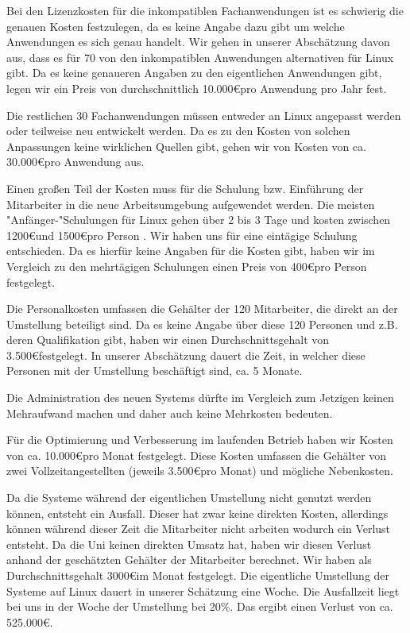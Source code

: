 \documentclass[12pt,utf8]{scrartcl}
\begin{document}
Bei den Lizenzkosten für die inkompatiblen Fachanwendungen ist es schwierig die genauen Kosten festzulegen, da es keine Angabe dazu gibt um welche Anwendungen es sich genau handelt. Wir gehen in unserer Abschätzung davon aus, dass es für 70 von den inkompatiblen Anwendungen alternativen für Linux gibt. Da es keine genaueren Angaben zu den eigentlichen Anwendungen gibt, legen wir ein Preis von durchschnittlich 10.000\euro \space pro Anwendung pro Jahr fest.

Die restlichen 30 Fachanwendungen müssen entweder an Linux angepasst werden oder teilweise neu entwickelt werden. Da es zu den Kosten von solchen Anpassungen keine wirklichen Quellen gibt, gehen wir von Kosten von ca. 30.000\euro pro Anwendung aus.

Einen großen Teil der Kosten muss für die Schulung bzw. Einführung der Mitarbeiter in die neue Arbeitsumgebung aufgewendet werden. Die meisten "Anfänger-"Schulungen für Linux gehen über 2 bis 3 Tage und kosten zwischen 1200\euro \space und 1500\euro \space pro Person \cite{itsch} \cite{protra}. Wir haben uns für eine eintägige Schulung entschieden. Da es hierfür keine Angaben für die Kosten gibt, haben wir im Vergleich zu den mehrtägigen Schulungen einen Preis von 400\euro \space pro Person festgelegt.

Die Personalkosten umfassen die Gehälter der 120 Mitarbeiter, die direkt an der Umstellung beteiligt sind. Da es keine Angabe über diese 120 Personen und z.B. deren Qualifikation gibt, haben wir einen Durchschnittsgehalt von 3.500\euro \space festgelegt. In unserer Abschätzung dauert die Zeit, in welcher diese Personen mit der Umstellung beschäftigt sind, ca. 5 Monate.

Die Administration des neuen Systems dürfte im Vergleich zum Jetzigen keinen Mehraufwand machen und daher auch keine Mehrkosten bedeuten.

Für die Optimierung und Verbesserung im laufenden Betrieb haben wir Kosten von ca. 10.000\euro \space pro Monat festgelegt. Diese Kosten umfassen die Gehälter von zwei Vollzeitangestellten (jeweils 3.500\euro \space pro Monat) und mögliche Nebenkosten.

Da die Systeme während der eigentlichen Umstellung nicht genutzt werden können, entsteht ein Ausfall. Dieser hat zwar keine direkten Kosten, allerdings können während dieser Zeit die Mitarbeiter nicht arbeiten wodurch ein Verlust entsteht. Da die Uni keinen direkten Umsatz hat, haben wir diesen Verlust anhand der geschätzten Gehälter der Mitarbeiter berechnet. Wir haben als Durchschnittsgehalt 3000\euro \space im Monat festgelegt. 
Die eigentliche Umstellung der Systeme auf Linux dauert in unserer Schätzung eine Woche. Die Ausfallzeit liegt bei uns in der Woche der Umstellung bei 20\%. Das ergibt einen Verlust von ca. 525.000\euro .
\end{document}
